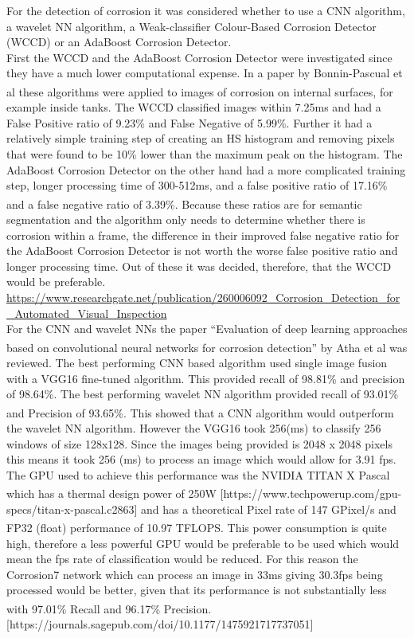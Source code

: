 \documentclass[11pt]{article}		%
\newcommand{\supercite}[1]{\textsuperscript{\cite{#1}}}		%
\begin{document}
	        For the detection of corrosion it was considered whether to use a CNN algorithm, a wavelet NN algorithm, a Weak-classifier Colour-Based Corrosion Detector (WCCD) or an AdaBoost Corrosion Detector.
	        \\
	        First the WCCD and the AdaBoost Corrosion Detector were investigated since they have a much lower computational expense. 
	        In a paper by Bonnin-Pascual et al\supercite{WCCD} these algorithms were applied to images of corrosion on internal surfaces, for example inside tanks. The WCCD classified images within 7.25ms and had a False Positive ratio of 9.23\% and False Negative of 5.99\%. Further it had a relatively simple training step of creating an HS histogram and removing pixels that were found to be 10\% lower than the maximum peak on the histogram.
	        The AdaBoost Corrosion Detector on the other hand had a more complicated training step, longer processing time of 300-512ms, and a false positive ratio of 17.16\% and a false negative ratio of 3.39\%.\supercite{WCCD}  
	        Because these ratios are for semantic segmentation and the algorithm only needs to determine whether there is corrosion within a frame, the difference in their improved false negative ratio for the AdaBoost Corrosion Detector is not worth the worse false positive ratio and longer processing time. 
	        Out of these it was decided, therefore, that the WCCD would be preferable.  \url{https://www.researchgate.net/publication/260006092_Corrosion_Detection_for_Automated_Visual_Inspection}
	        \\
	        For the CNN and wavelet NNs the paper “Evaluation of deep learning approaches based on convolutional neural networks for corrosion detection” by Atha et al\supercite{Corrosion7}  was reviewed. The best performing CNN based algorithm used single image fusion with a VGG16 fine-tuned algorithm. This provided recall of 98.81\% and precision of 98.64\%. The best performing wavelet NN algorithm provided recall of 93.01\% and Precision of 93.65\%. \supercite{Corrosion7} This showed that a CNN algorithm would outperform the wavelet NN algorithm. However the VGG16 took 256(ms) to classify 256 windows of size 128x128. Since the images being provided is 2048 x 2048 pixels this means it took 256 (ms) to process an image which would allow for 3.91 fps. The GPU used to achieve this performance was the NVIDIA TITAN X Pascal which has a thermal design power of 250W \supercite{Nvidia_Titan}[https://www.techpowerup.com/gpu-specs/titan-x-pascal.c2863] and has a theoretical Pixel rate of 147 GPixel/s and FP32 (float) performance of 10.97 TFLOPS.\supercite{Corrosion7} This power consumption is quite high, therefore a less powerful GPU would be preferable to be used which would mean the fps rate of classification would be reduced. For this reason the Corrosion7 network which can process an image in 33ms giving 30.3fps being processed would be better, given that its performance is not substantially less with 97.01\% Recall and 96.17\% Precision.\supercite{Corrosion7}[https://journals.sagepub.com/doi/10.1177/1475921717737051]
\end{document}
